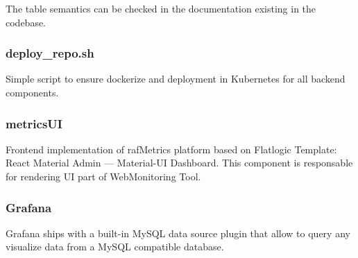 The table semantics can be checked in the documentation existing in the codebase.


\subsubsection{deploy\_repo.sh}
Simple script to ensure dockerize and deployment in Kubernetes for all backend components.

\subsubsection{metricsUI}
Frontend implementation of rafMetrics platform based on Flatlogic Template: React Material Admin — Material-UI Dashboard. This component is responsable for rendering UI part of WebMonitoring Tool.

\subsubsection{Grafana}
Grafana ships with a built-in MySQL data source plugin that allow to query any visualize data from a MySQL compatible database.